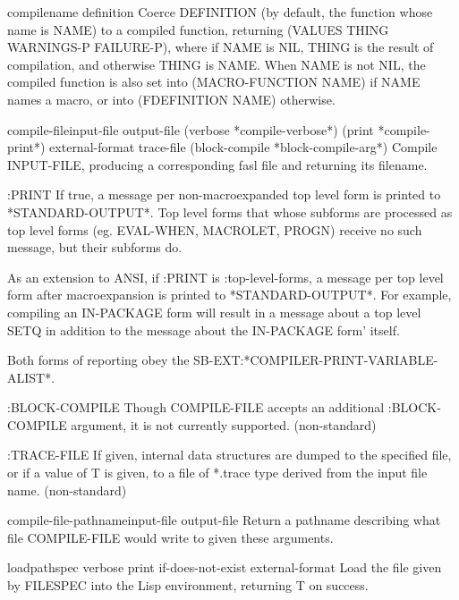 \documentclass[10pt,english]{book}
\begin{document}
\begin{function}{compile}{name \op definition}
  Coerce DEFINITION (by default, the function whose name is NAME)
  to a compiled function, returning (VALUES THING WARNINGS-P FAILURE-P),
  where if NAME is NIL, THING is the result of compilation, and
  otherwise THING is NAME. When NAME is not NIL, the compiled function
  is also set into (MACRO-FUNCTION NAME) if NAME names a macro, or into
  (FDEFINITION NAME) otherwise.
\end{function}

\begin{function}{compile-file}{input-file \key output-file (verbose *compile-verbose*)
 (print *compile-print*) external-format trace-file
 (block-compile *block-compile-arg*)}
  Compile INPUT-FILE, producing a corresponding fasl file and
returning its filename.

  :PRINT
     If true, a message per non-macroexpanded top level form is printed
     to *STANDARD-OUTPUT*. Top level forms that whose subforms are
     processed as top level forms (eg. EVAL-WHEN, MACROLET, PROGN) receive
     no such message, but their subforms do.

     As an extension to ANSI, if :PRINT is :top-level-forms, a message
     per top level form after macroexpansion is printed to *STANDARD-OUTPUT*.
     For example, compiling an IN-PACKAGE form will result in a message about
     a top level SETQ in addition to the message about the IN-PACKAGE form'
     itself.

     Both forms of reporting obey the SB-EXT:*COMPILER-PRINT-VARIABLE-ALIST*.

  :BLOCK-COMPILE
     Though COMPILE-FILE accepts an additional :BLOCK-COMPILE
     argument, it is not currently supported. (non-standard)

  :TRACE-FILE
     If given, internal data structures are dumped to the specified
     file, or if a value of T is given, to a file of *.trace type
     derived from the input file name. (non-standard)
\end{function}

\begin{function}{compile-file-pathname}{input-file \key output-file \akeys}
  Return a pathname describing what file COMPILE-FILE would write to given
  these arguments.
\end{function}

\begin{function}{load}{pathspec \key verbose print if-does-not-exist external-format}
  Load the file given by FILESPEC into the Lisp environment, returning
   T on success.
\end{function}
\end{document}
